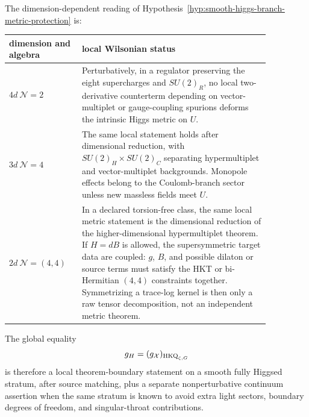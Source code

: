 The dimension-dependent reading of
Hypothesis~\ref{hyp:smooth-higgs-branch-metric-protection} is:
\begin{center}
\begin{tabular}{@{}p{0.22\linewidth}p{0.64\linewidth}@{}}
\textbf{dimension and algebra} & \textbf{local Wilsonian status}\\ \hline
\(4d\ \mathcal N=2\)
& Perturbatively, in a regulator preserving the eight supercharges and
\(SU(2)_R\), no local two-derivative counterterm depending on vector-multiplet
or gauge-coupling spurions deforms the intrinsic Higgs metric on \(U\).\\[0.4em]
\(3d\ \mathcal N=4\)
& The same local statement holds after dimensional reduction, with
\(SU(2)_H\times SU(2)_C\) separating hypermultiplet and vector-multiplet
backgrounds.  Monopole effects belong to the Coulomb-branch sector unless new
massless fields meet \(U\).\\[0.4em]
\(2d\ \mathcal N=(4,4)\)
& In a declared torsion-free class, the same local metric statement is the
dimensional reduction of the higher-dimensional hypermultiplet theorem.  If
\(H=dB\) is allowed, the supersymmetric target data are coupled:
\(g\), \(B\), and possible dilaton or source terms must satisfy the HKT or
bi-Hermitian \((4,4)\) constraints together.  Symmetrizing a trace-log kernel is
then only a raw tensor decomposition, not an independent metric theorem.
\end{tabular}
\end{center}
The global equality
\begin{equation}
  g_H
  =
  (g_{\mathcal X})_{{\rm HKQ}_{\zeta,G}}
  \label{eq:higgs-branch-protected-quotient-metric}
\end{equation}
is therefore a local theorem-boundary statement on a smooth fully Higgsed
stratum, after source matching, plus a separate nonperturbative continuum
assertion when the same stratum is known to avoid extra light sectors,
boundary degrees of freedom, and singular-throat contributions.

